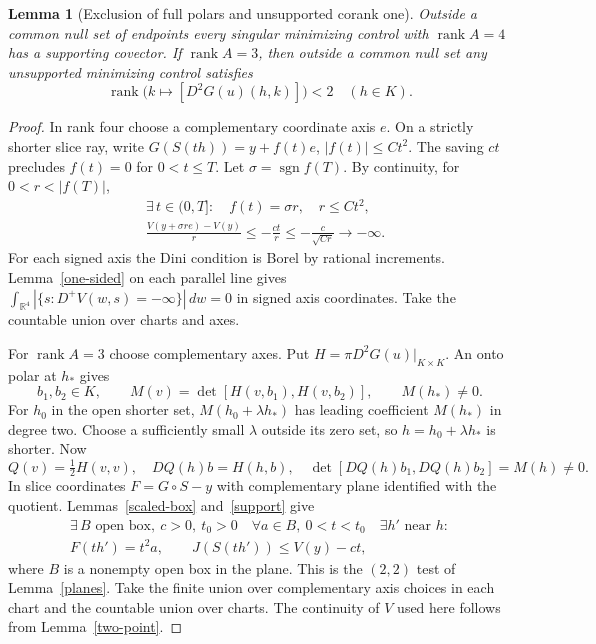 \documentclass[11pt,letterpaper]{article}
\newtheorem{lemma}[theorem]{Lemma}
\newcommand{\R}{\mathbb R}
\newcommand{\rank}{\operatorname{rank}}
\begin{document}
\begin{lemma}[Exclusion of full polars and unsupported corank one]\label{scalar}
Outside a common null set of endpoints every singular minimizing control with
$\rank A=4$ has a supporting covector. If $\rank A=3$, then outside a common
null set any unsupported minimizing control satisfies
\[
 \rank\big(k\mapsto [D^2G(u)(h,k)]\big)<2\quad(h\in K).
\]
\end{lemma}
\begin{proof}
In rank four choose a complementary coordinate axis $e$. On a strictly
shorter slice ray, write $G(S(th))=y+f(t)e$, $|f(t)|\le Ct^2$.
The saving $ct$ precludes $f(t)=0$ for $0<t\le T$. Let
$\sigma=\operatorname{sgn} f(T)$. By continuity, for $0<r<|f(T)|$,
\[
 \begin{aligned}
 &\exists\,t\in(0,T]:\quad f(t)=\sigma r,\quad r\le Ct^2,\\
 &\frac{V(y+\sigma r e)-V(y)}r\le-\frac{ct}{r}
                         \le-\frac c{\sqrt{Cr}}\longrightarrow-\infty .
 \end{aligned}
\]
For each signed axis the Dini condition is Borel by rational increments.
Lemma~\ref{one-sided} on each parallel line gives
$\int_{\R^4}|\{s:D^+V(w,s)=-\infty\}|\,dw=0$ in signed axis coordinates.
Take the countable union over charts and axes.

For $\rank A=3$ choose complementary axes. Put $H=\pi D^2G(u)|_{K\times K}$.
An onto polar at $h_*$ gives
\[
 b_1,b_2\in K,\qquad M(v)=\det[H(v,b_1),H(v,b_2)],\qquad M(h_*)\ne0 .
\]
For $h_0$ in the open shorter set, $M(h_0+\lambda h_*)$ has leading
coefficient $M(h_*)$ in degree two. Choose a sufficiently small $\lambda$
outside its zero set, so $h=h_0+\lambda h_*$ is shorter. Now
\[
 Q(v)=\tfrac12 H(v,v),\quad DQ(h)b=H(h,b),\quad
 \det[DQ(h)b_1,DQ(h)b_2]=M(h)\ne0 .
\]
In slice coordinates $F=G\circ S-y$ with complementary plane identified
with the quotient. Lemmas~\ref{scaled-box} and~\ref{support} give
\[
 \begin{gathered}
 \exists\, B\text{ open box},\ c>0,\ t_0>0\quad
 \forall a\in B,\ 0<t<t_0\quad\exists h'\text{ near }h:\\
 F(th')=t^2a,\qquad J(S(th'))\le V(y)-ct ,
 \end{gathered}
\]
where $B$ is a nonempty open box in the plane. This is the $(2,2)$
test of Lemma~\ref{planes}. Take the finite union over complementary axis
choices in each chart and the countable union over charts. The continuity
of $V$ used here follows from Lemma~\ref{two-point}.
\end{proof}
\end{document}
